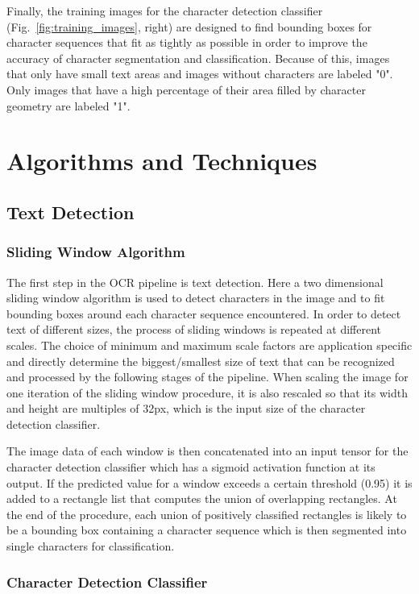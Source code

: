 \documentclass[11pt]{article}
\begin{document}
Finally, the training images for the character detection classifier (Fig.~\ref{fig:training_images}, right) are
designed to find bounding boxes for character sequences that fit as tightly as possible in order to improve
the accuracy of character segmentation and classification.
%
Because of this, images that only have small
text areas and images without characters are labeled "0".
%
Only images that have a high percentage of their area filled by character geometry are labeled "1".

\section{Algorithms and Techniques}
\subsection{Text Detection}
\subsubsection{Sliding Window Algorithm}
The first step in the OCR pipeline is text detection.
%
Here a two dimensional sliding window algorithm is used to detect characters in the image and to fit bounding boxes
around each character sequence encountered.
%
In order to detect text of different sizes, the process of sliding windows is repeated at different
scales.
%
The choice of minimum and maximum scale factors are application specific and directly determine the
biggest/smallest size of text that can be recognized and processed by the following stages of the
pipeline.
%
When scaling the image for one iteration of the sliding window procedure, it is also rescaled
so that its width and height are multiples of 32px, which is the input size of the character detection
classifier.

The image data of each window is then concatenated into an input tensor for the character detection
classifier which has a sigmoid activation function at its output.
%
If the predicted value for a window exceeds a certain threshold (0.95) it is added to a rectangle list that computes
the union of overlapping rectangles.
%
At the end of the procedure, each union of positively classified rectangles is likely to be a bounding
box containing a character sequence which is then segmented into single characters for classification.

\subsubsection{Character Detection Classifier}
\end{document}
